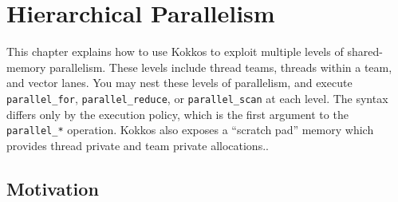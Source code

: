 \chapter{Hierarchical Parallelism}\label{C:Hierarchical}

This chapter explains how to use Kokkos to exploit multiple levels of shared-memory parallelism.
These levels include thread teams, threads within a team, and vector lanes.
You may nest these levels of parallelism,
and execute \lstinline!parallel_for!, \lstinline!parallel_reduce!, or \lstinline!parallel_scan! at each level.
The syntax differs only by the execution policy,
which is the first argument to the \verb!parallel_*! operation.
Kokkos also exposes a ``scratch pad'' memory which provides thread private and team private allocations..

\section{Motivation}\label{S:Hierarchical:Motivation}

